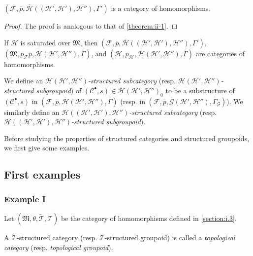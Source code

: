 \documentclass[a4paper,fleqn]{article}
\theoremstyle{plain}
\newenvironment{theorem}[1]
  {\renewcommand\theinnertheorem{#1}\innertheorem}
  {\endinnertheorem}
\theoremstyle{definition}
\newenvironment{definition}[1]
  {\renewcommand\theinnerdefinition{#1}\innerdefinition}
  {\endinnerdefinition}
\newcommand{\oldpage}[1]{{\marginpar{\footnotesize$\bigg\vert$\,\,\,\,\textit{p.~#1}}}}
\newcommand{\CC}{\mathcal{C}}
\newcommand{\HH}{\mathcal{H}}
\newcommand{\bHH}{\overline{\HH}}
\newcommand{\MM}{\mathfrak{M}}
\newcommand{\FF}{\mathcal{F}}
\newcommand{\TT}{\mathcal{T}}
\newcommand{\tTT}{\widetilde{\TT}}
\newcommand{\GG}{\mathcal{G}}
\begin{document}
\oldpage{386}

\begin{theorem}{2}
\label{theorem:ii-2}
  $(\FF,\overline{p},\bHH((\HH',\HH'),\HH''),\Gamma')$ is a category of homomorphisms.
\end{theorem}

\begin{proof}
  The proof is analogous to that of \cref{theorem:ii-1}.
\end{proof}

\begin{theorem}{3}
\label{theorem:ii-3}
  If $\HH$ is saturated over $\MM$, then $(\FF,\overline{p},\bHH((\HH',\HH'),\HH''),\Gamma')$, $(\MM,p_\FF\overline{p},\bHH(\HH',\HH''),\overline{\Gamma})$, and $(\HH,\overline{p}_\HH,\bHH(\HH',\HH''),\overline{\Gamma})$ are categories of homomorphisms.
\end{theorem}

\begin{definition}{6}
\label{definition:ii-6}
  We define an \emph{$\HH(\HH',\HH'')$-structured subcategory} (resp. \emph{$\HH(\HH',\HH'')$-structured subgroupoid}) of $(\CC^\bullet,s)\in\bHH(\HH',\HH'')_0$ to be a substructure of $(\CC^\bullet,s)$ in $(\FF,\overline{p},\bHH(\HH',\HH''),\overline{\Gamma})$ (resp. in $(\FF,\overline{p},\overline{\GG}(\HH',\HH''),\overline{\Gamma}_\GG)$).
  We similarly define an \emph{$\HH((\HH',\HH'),\HH'')$-structured subcategory} (resp. \emph{$\HH((\HH',\HH'),\HH'')$-structured subgroupoid}).
\end{definition}

Before studying the properties of structured categories and structured groupoids, we first give some examples.


\subsection{First examples}
\label{section:ii.3}

\subsubsection*{Example I}
\label{section:ii.3.i}

Let $(\MM,\theta,\tTT,\TT)$ be the category of homomorphisms defined in \cref{section:i.3}.

\begin{definition}{7}
\label{definition:ii-7}
  A $\tTT$-structured category (resp. $\tTT$-structured groupoid) is called a \emph{topological category} (resp. \emph{topological groupoid}).
\end{definition}
\end{document}
